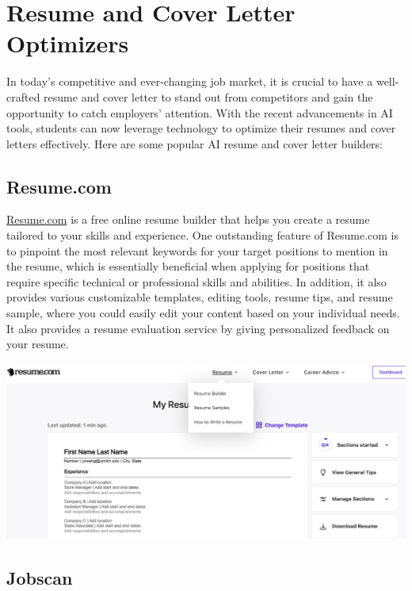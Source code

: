 \documentclass[
]{book}
\begin{document}
\hypertarget{resume-and-cover-letter-optimizers}{%
\chapter{Resume and Cover Letter Optimizers}\label{resume-and-cover-letter-optimizers}}

In today's competitive and ever-changing job market, it is crucial to have a well-crafted resume and cover letter to stand out from competitors and gain the opportunity to catch employers' attention. With the recent advancements in AI tools, students can now leverage technology to optimize their resumes and cover letters effectively. Here are some popular AI resume and cover letter builders:

\hypertarget{resume.com}{%
\section{Resume.com}\label{resume.com}}

\href{https://www.resume.com/resume/builder/783ccdad-f0ea-4ff0-aa57-c59d6100995a}{Resume.com} is a free online resume builder that helps you create a resume tailored to your skills and experience. One outstanding feature of Resume.com is to pinpoint the most relevant keywords for your target positions to mention in the resume, which is essentially beneficial when applying for positions that require specific technical or professional skills and abilities. In addition, it also provides various customizable templates, editing tools, resume tips, and resume sample, where you could easily edit your content based on your individual needs. It also provides a resume evaluation service by giving personalized feedback on your resume.

\includegraphics[width=5.90625in,height=\textheight]{Resume.com pic.png}

\hypertarget{jobscan}{%
\section{Jobscan}\label{jobscan}}
\end{document}
